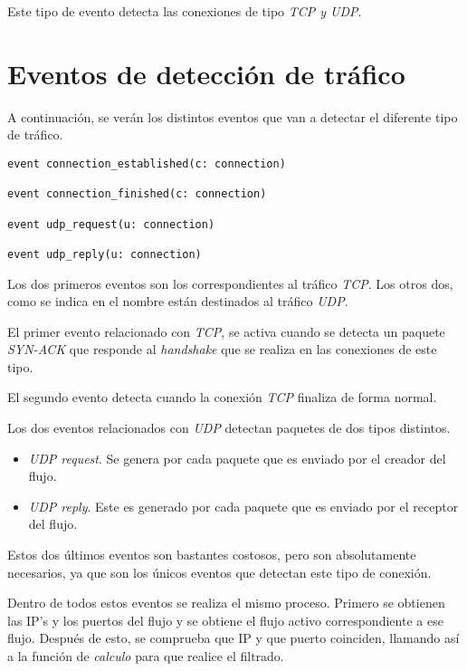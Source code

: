 \intro Este tipo de evento detecta las conexiones de tipo \textit{TCP y UDP}.


\section{Eventos de detección de tráfico}
\intro A continuación, se verán los distintos eventos que van a detectar el diferente tipo de tráfico.

\begin{lstlisting}[style=CodigoC]
event connection_established(c: connection)

event connection_finished(c: connection)

event udp_request(u: connection)

event udp_reply(u: connection)

\end{lstlisting}

\intro Los dos primeros eventos son los correspondientes al tráfico \textit{TCP}. Los otros dos, como se indica  
en el nombre están destinados al tráfico \textit{UDP}.

\intro El primer evento relacionado con \textit{TCP}, se activa cuando se detecta un paquete \textit{SYN-ACK} que 
responde al \textit{handshake} que se realiza en las conexiones de este tipo.

\intro El segundo evento detecta cuando la conexión \textit{TCP} finaliza de forma normal.

\intro Los dos eventos relacionados con \textit{UDP} detectan paquetes de dos tipos distintos.

\begin{itemize}
\item \textit{UDP request}. Se genera por cada paquete que es enviado por el creador del flujo.
\item \textit{UDP reply}. Este es generado por cada paquete que es enviado por el receptor del flujo.
\end{itemize}

\intro Estos dos últimos eventos son bastantes costosos, pero son absolutamente necesarios, ya que son los únicos 
eventos que detectan este tipo de conexión.

\intro Dentro de todos estos eventos se realiza el mismo proceso. Primero se obtienen las IP's y los puertos del flujo y se obtiene 
el flujo activo correspondiente a ese flujo. Después de esto, se comprueba que IP y que puerto coinciden, llamando así a la función de 
\textit{calculo} para que realice el filtrado.

